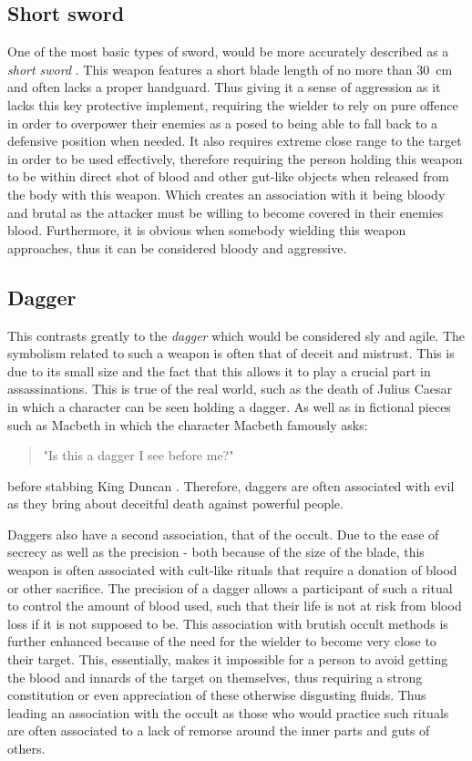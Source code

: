 \documentclass{article}
\begin{document}
\subsection*{Short sword} \label{shortSwordSymbol}
One of the most basic types of sword, would be more accurately described as a \emph{short sword} \parencite{mcnab2010swords}. This weapon features a short blade length of no more than 30 cm and often lacks a proper handguard. Thus giving it a sense of aggression as it lacks this key protective implement, requiring the wielder to rely on pure offence in order to overpower their enemies as a posed to being able to fall back to a defensive position when needed. It also requires extreme close range to the target in order to be used effectively, therefore requiring the person holding this weapon to be within direct shot of blood and other gut-like objects when released from the body with this weapon. Which creates an association with it being bloody and brutal as the attacker must be willing to become covered in their enemies blood. Furthermore, it is obvious when somebody wielding this weapon approaches, thus it can be considered bloody and aggressive.

\subsection*{Dagger}
This contrasts greatly to the \emph{dagger} which would be considered sly and agile. The symbolism related to such a weapon is often that of deceit and mistrust. This is due to its small size and the fact that this allows it to play a crucial part in assassinations. This is true of the real world, such as the death of Julius Caesar \parencite{caesar} in which a character can be seen holding a dagger. As well as in fictional pieces such as Macbeth in which the character Macbeth famously asks: \begin{quote}
    "Is this a dagger I see before me?"
\end{quote}
before stabbing King Duncan \parencite{macbeth}. Therefore, daggers are often associated with evil as they bring about deceitful death against powerful people.

Daggers also have a second association, that of the occult. Due to the ease of secrecy as well as the precision - both because of the size of the blade, this weapon is often associated with cult-like rituals that require a donation of blood or other sacrifice. The precision of a dagger allows a participant of such a ritual to control the amount of blood used, such that their life is not at risk from blood loss if it is not supposed to be. This association with brutish occult methods is further enhanced because of the need for the wielder to become very close to their target. This, essentially, makes it impossible for a person to avoid getting the blood and innards of the target on themselves, thus requiring a strong constitution or even appreciation of these otherwise disgusting fluids. Thus leading an association with the occult as those who would practice such rituals are often associated to a lack of remorse around the inner parts and guts of others.
\end{document}
